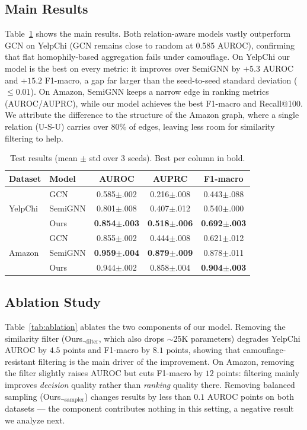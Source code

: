 \documentclass[conference]{IEEEtran}
\begin{document}
\subsection{Main Results}
Table~\ref{tab:main} shows the main results. Both relation-aware models
vastly outperform GCN on YelpChi (GCN remains close to random at 0.585
AUROC), confirming that flat homophily-based aggregation fails under
camouflage. On YelpChi our model is the best on every metric: it improves
over SemiGNN by $+5.3$ AUROC and $+15.2$ F1-macro, a gap far larger than
the seed-to-seed standard deviation ($\leq 0.01$). On Amazon, SemiGNN keeps
a narrow edge in ranking metrics (AUROC/AUPRC), while our model achieves the
best F1-macro and Recall@100. We attribute the difference to the structure
of the Amazon graph, where a single relation (U-S-U) carries over 80\% of
edges, leaving less room for similarity filtering to help.

\begin{table}[t]
\centering
\caption{Test results (mean $\pm$ std over 3 seeds). Best per column in bold.}
\label{tab:main}
\begin{tabular}{llccc}
\hline
\textbf{Dataset} & \textbf{Model} & \textbf{AUROC} & \textbf{AUPRC} & \textbf{F1-macro} \\
\hline
\multirow{3}{*}{YelpChi}
 & GCN      & 0.585$\pm$.002 & 0.216$\pm$.008 & 0.443$\pm$.088 \\
 & SemiGNN  & 0.801$\pm$.008 & 0.407$\pm$.012 & 0.540$\pm$.000 \\
 & Ours     & \textbf{0.854$\pm$.003} & \textbf{0.518$\pm$.006} & \textbf{0.692$\pm$.003} \\
\hline
\multirow{3}{*}{Amazon}
 & GCN      & 0.855$\pm$.002 & 0.444$\pm$.008 & 0.621$\pm$.012 \\
 & SemiGNN  & \textbf{0.959$\pm$.004} & \textbf{0.879$\pm$.009} & 0.878$\pm$.011 \\
 & Ours     & 0.944$\pm$.002 & 0.858$\pm$.004 & \textbf{0.904$\pm$.003} \\
\hline
\end{tabular}
\end{table}

\subsection{Ablation Study}
Table~\ref{tab:ablation} ablates the two components of our model.
Removing the similarity filter (Ours$_{\neg\text{filter}}$, which also drops
$\sim$25K parameters) degrades YelpChi AUROC by $4.5$ points and F1-macro by
$8.1$ points, showing that camouflage-resistant filtering is the main driver
of the improvement. On Amazon, removing the filter slightly raises
AUROC but cuts F1-macro by $12$ points: filtering mainly improves
\emph{decision} quality rather than \emph{ranking} quality there. Removing
balanced sampling (Ours$_{\neg\text{sampler}}$) changes results by less than
$0.1$ AUROC points on both datasets --- the component contributes nothing in
this setting, a negative result we analyze next.
\end{document}
